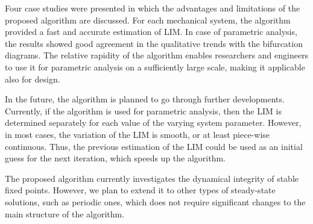 \documentclass[preprint,12pt]{elsarticle}
\begin{document}
	Four case studies were presented in which the advantages and limitations of the proposed algorithm are discussed. For each mechanical system, the algorithm provided a fast and accurate estimation of LIM. In case of parametric analysis, the results showed good agreement in the qualitative trends with the bifurcation diagrams. The relative rapidity of the algorithm enables researchers and engineers to use it for parametric analysis on a sufficiently large scale, making it applicable also for design.
	
	In the future, the algorithm is planned to go through further developments. Currently, if the algorithm is used for parametric analysis, then the LIM is determined separately for each value of the varying system parameter. However, in most cases, the variation of the LIM is smooth, or at least piece-wise continuous. Thus, the previous estimation of the LIM could be used as an initial guess for the next iteration, which  speeds up the algorithm.
	
	The proposed algorithm currently investigates the dynamical integrity of stable fixed points. However, we plan to extend it to other types of steady-state solutions, such as periodic ones, which does not require significant changes to the main structure of the algorithm.
	
	
	
	
\end{document}
